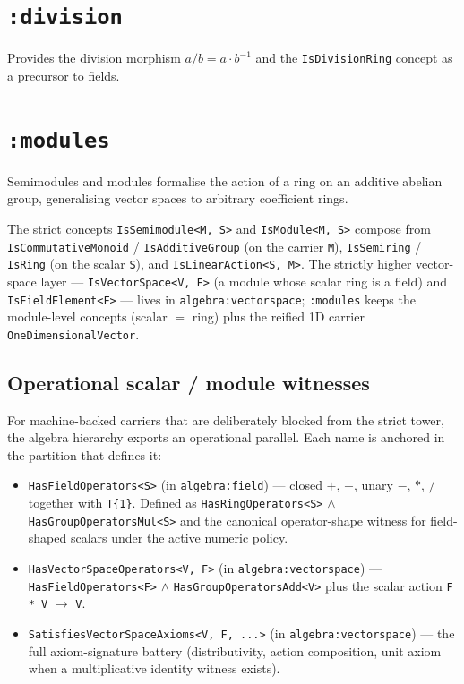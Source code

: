 \documentclass[11pt, a4paper]{report}
\begin{document}
\section{\texttt{:division}}
\label{sec:algebra-division}

Provides the division morphism $a / b = a \cdot b^{-1}$ and the \texttt{IsDivisionRing} concept as a precursor to fields.

\section{\texttt{:modules}}
\label{sec:algebra-modules}

Semimodules and modules formalise the action of a ring on an additive abelian group, generalising vector spaces to arbitrary coefficient rings.

The strict concepts \texttt{IsSemimodule<M, S>} and \texttt{IsModule<M, S>} compose from \texttt{IsCommutativeMonoid} / \texttt{IsAdditiveGroup} (on the carrier \texttt{M}), \texttt{IsSemiring} / \texttt{IsRing} (on the scalar \texttt{S}), and \texttt{IsLinearAction<S, M>}. The strictly higher vector-space layer --- \texttt{IsVectorSpace<V, F>} (a module whose scalar ring is a field) and \texttt{IsFieldElement<F>} --- lives in \texttt{algebra:vectorspace}; \texttt{:modules} keeps the module-level concepts (scalar $=$ ring) plus the reified 1D carrier \texttt{OneDimensionalVector}.

\subsection{Operational scalar / module witnesses}

For machine-backed carriers that are deliberately blocked from the strict tower, the algebra hierarchy exports an operational parallel.  Each name is anchored in the partition that defines it:

\begin{itemize}
  \item \texttt{HasFieldOperators<S>} (in \texttt{algebra:field}) --- closed $+$, $-$, unary $-$, $*$, $/$ together with \texttt{T\{1\}}.  Defined as \texttt{HasRingOperators<S>} $\wedge$ \texttt{HasGroupOperatorsMul<S>} and the canonical operator-shape witness for field-shaped scalars under the active numeric policy.
  \item \texttt{HasVectorSpaceOperators<V, F>} (in \texttt{algebra:vectorspace}) --- \texttt{HasFieldOperators<F>} $\wedge$ \texttt{HasGroupOperatorsAdd<V>} plus the scalar action \texttt{F * V} $\to$ \texttt{V}.
  \item \texttt{SatisfiesVectorSpaceAxioms<V, F, ...>} (in \texttt{algebra:vectorspace}) --- the full axiom-signature battery (distributivity, action composition, unit axiom when a multiplicative identity witness exists).
\end{itemize}
\end{document}
